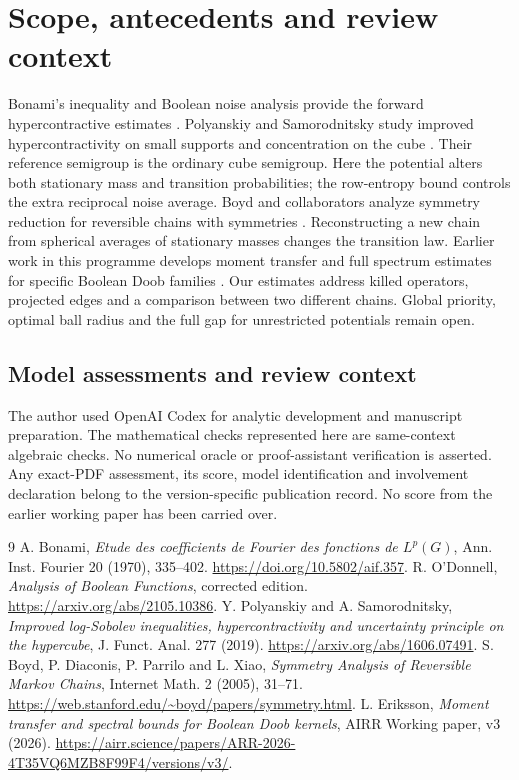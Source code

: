 \documentclass[11pt]{article}
\begin{document}
\section{Scope, antecedents and review context}
Bonami's inequality and Boolean noise analysis provide the forward hypercontractive estimates \cite{bonami,od}. Polyanskiy and Samorodnitsky study improved hypercontractivity on small supports and concentration on the cube \cite{ps}. Their reference semigroup is the ordinary cube semigroup. Here the potential alters both stationary mass and transition probabilities; the row-entropy bound controls the extra reciprocal noise average. Boyd and collaborators analyze symmetry reduction for reversible chains with symmetries \cite{boyd}. Reconstructing a new chain from spherical averages of stationary masses changes the transition law. Earlier work in this programme develops moment transfer and full spectrum estimates for specific Boolean Doob families \cite{prev}. Our estimates address killed operators, projected edges and a comparison between two different chains. Global priority, optimal ball radius and the full gap for unrestricted potentials remain open.

\subsection*{Model assessments and review context}
The author used OpenAI Codex for analytic development and manuscript preparation. The mathematical checks represented here are same-context algebraic checks. No numerical oracle or proof-assistant verification is asserted. Any exact-PDF assessment, its score, model identification and involvement declaration belong to the version-specific publication record. No score from the earlier working paper has been carried over.
\begin{thebibliography}{9}
 A. Bonami, \emph{Etude des coefficients de Fourier des fonctions de $L^p(G)$}, Ann. Inst. Fourier 20 (1970), 335--402. \url{https://doi.org/10.5802/aif.357}.
 R. O'Donnell, \emph{Analysis of Boolean Functions}, corrected edition. \url{https://arxiv.org/abs/2105.10386}.
 Y. Polyanskiy and A. Samorodnitsky, \emph{Improved log-Sobolev inequalities, hypercontractivity and uncertainty principle on the hypercube}, J. Funct. Anal. 277 (2019). \url{https://arxiv.org/abs/1606.07491}.
 S. Boyd, P. Diaconis, P. Parrilo and L. Xiao, \emph{Symmetry Analysis of Reversible Markov Chains}, Internet Math. 2 (2005), 31--71. \url{https://web.stanford.edu/~boyd/papers/symmetry.html}.
 L. Eriksson, \emph{Moment transfer and spectral bounds for Boolean Doob kernels}, AIRR Working paper, v3 (2026). \url{https://airr.science/papers/ARR-2026-4T35VQ6MZB8F99F4/versions/v3/}.
\end{thebibliography}
\end{document}
